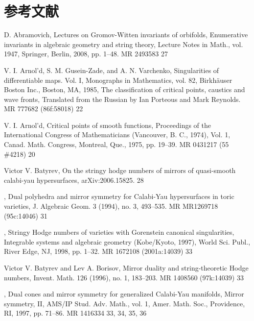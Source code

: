 \clearpage
\section*{参考文献}
{\small
\setlength{\parindent}{0pt}
\begin{list}{}{%
  \setlength{\leftmargin}{3.8em}%
  \setlength{\itemindent}{-3.8em}%
  \setlength{\itemsep}{1.5pt}%
  \setlength{\parsep}{0pt}%
  \setlength{\listparindent}{0pt}%
}
\item[{[Abr08]}] D. Abramovich, Lectures on Gromov-Witten invariants of orbifolds, Enumerative invariants in algebraic geometry and string theory, Lecture Notes in Math., vol. 1947, Springer, Berlin, 2008, pp. 1--48. MR 2493583 27
\item[{[AGZV85]}] V. I. Arnol'd, S. M. Gusein-Zade, and A. N. Varchenko, Singularities of differentiable maps. Vol. I, Monographs in Mathematics, vol. 82, Birkhäuser Boston Inc., Boston, MA, 1985, The classification of critical points, caustics and wave fronts, Translated from the Russian by Ian Porteous and Mark Reynolds. MR 777682 (86f:58018) 22
\item[{[Arn75]}] V. I. Arnol'd, Critical points of smooth functions, Proceedings of the International Congress of Mathematicians (Vancouver, B. C., 1974), Vol. 1, Canad. Math. Congress, Montreal, Que., 1975, pp. 19--39. MR 0431217 (55 \#4218) 20
\item[{[Bat]}] Victor V. Batyrev, On the stringy hodge numbers of mirrors of quasi-smooth calabi-yau hypersurfaces, arXiv:2006.15825. 28
\item[{[Bat94]}] , Dual polyhedra and mirror symmetry for Calabi-Yau hypersurfaces in toric varieties, J. Algebraic Geom. 3 (1994), no. 3, 493--535. MR MR1269718 (95c:14046) 31
\item[{[Bat98]}] , Stringy Hodge numbers of varieties with Gorenstein canonical singularities, Integrable systems and algebraic geometry (Kobe/Kyoto, 1997), World Sci. Publ., River Edge, NJ, 1998, pp. 1--32. MR 1672108 (2001a:14039) 33
\item[{[BB96]}] Victor V. Batyrev and Lev A. Borisov, Mirror duality and string-theoretic Hodge numbers, Invent. Math. 126 (1996), no. 1, 183--203. MR 1408560 (97k:14039) 33
\item[{[BB97]}] , Dual cones and mirror symmetry for generalized Calabi-Yau manifolds, Mirror symmetry, II, AMS/IP Stud. Adv. Math., vol. 1, Amer. Math. Soc., Providence, RI, 1997, pp. 71--86. MR 1416334 33, 34, 35, 36

\end{list}}
